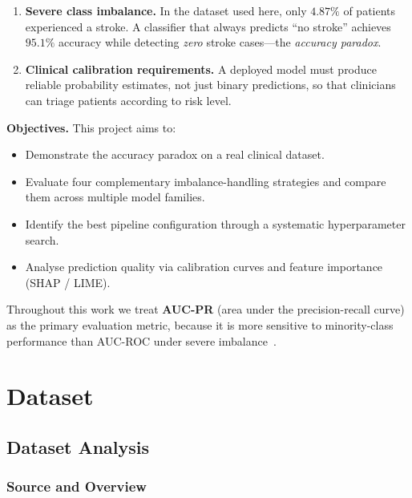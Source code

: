 \documentclass[11pt,a4paper]{article}
\begin{document}
\begin{enumerate}
  \item \textbf{Severe class imbalance.}
        In the dataset used here, only $4.87\%$ of patients experienced a stroke.
        A classifier that always predicts ``no stroke'' achieves $95.1\%$ accuracy while detecting \emph{zero} stroke cases—the \emph{accuracy paradox}.

  \item \textbf{Clinical calibration requirements.}
        A deployed model must produce reliable probability estimates, not just binary predictions, so that clinicians can triage patients according to risk level.
\end{enumerate}

\textbf{Objectives.}
This project aims to:
\begin{itemize}
  \item Demonstrate the accuracy paradox on a real clinical dataset.
  \item Evaluate four complementary imbalance-handling strategies and compare them across multiple model families.
  \item Identify the best pipeline configuration through a systematic hyperparameter search.
  \item Analyse prediction quality via calibration curves and feature importance (SHAP / LIME).
\end{itemize}

Throughout this work we treat \textbf{AUC-PR} (area under the precision-recall curve) as the primary evaluation metric, because it is more sensitive to minority-class performance than AUC-ROC under severe imbalance~\cite{davis2006relationship}.

\section{Dataset}
\label{sec:dataset}

\subsection{Dataset Analysis}

\subsubsection{Source and Overview}
\end{document}
